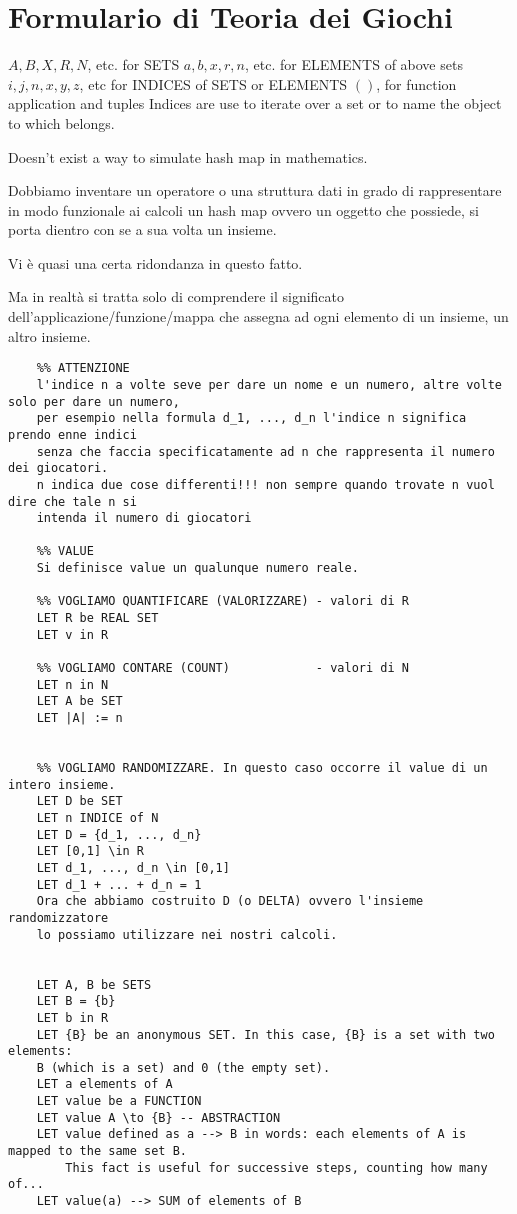 \section{Formulario di Teoria dei Giochi}


$A, B, X, R, N$, etc. for SETS
$a, b, x, r, n$, etc. for ELEMENTS of above sets
$i, j, n, x, y, z$, etc for INDICES of SETS or ELEMENTS
$()$, for function application and tuples
Indices are use to iterate over a set or to name the object to which belongs.

Doesn't exist a way to simulate hash map in mathematics. 

Dobbiamo inventare un operatore o una struttura dati in grado di rappresentare in modo funzionale ai calcoli un hash map ovvero un oggetto che possiede, si porta dientro con se a sua volta un insieme.

Vi \`e quasi una certa ridondanza in questo fatto.

Ma in realt\`a si tratta solo di comprendere il significato dell'applicazione/funzione/mappa che assegna ad ogni elemento di un insieme, un altro insieme.


\begin{verbatim}
	%% ATTENZIONE
	l'indice n a volte seve per dare un nome e un numero, altre volte solo per dare un numero, 
	per esempio nella formula d_1, ..., d_n l'indice n significa prendo enne indici
	senza che faccia specificatamente ad n che rappresenta il numero dei giocatori. 
	n indica due cose differenti!!! non sempre quando trovate n vuol dire che tale n si
	intenda il numero di giocatori 

	%% VALUE
	Si definisce value un qualunque numero reale. 

    %% VOGLIAMO QUANTIFICARE (VALORIZZARE) - valori di R
    LET R be REAL SET
    LET v in R
    
    %% VOGLIAMO CONTARE (COUNT)            - valori di N 
    LET n in N
    LET A be SET
    LET |A| := n 
    
    
    %% VOGLIAMO RANDOMIZZARE. In questo caso occorre il value di un intero insieme.
    LET D be SET
    LET n INDICE of N
    LET D = {d_1, ..., d_n}   
    LET [0,1] \in R
    LET d_1, ..., d_n \in [0,1]
    LET d_1 + ... + d_n = 1    
    Ora che abbiamo costruito D (o DELTA) ovvero l'insieme randomizzatore 
    lo possiamo utilizzare nei nostri calcoli.
    
    
	LET A, B be SETS
	LET B = {b}
	LET b in R
	LET {B} be an anonymous SET. In this case, {B} is a set with two elements: 
	B (which is a set) and 0 (the empty set). 
	LET a elements of A 
	LET value be a FUNCTION
	LET value A \to {B} -- ABSTRACTION
	LET value defined as a --> B in words: each elements of A is mapped to the same set B. 
	    This fact is useful for successive steps, counting how many of...	    	    
	LET value(a) --> SUM of elements of B
\end{verbatim}

